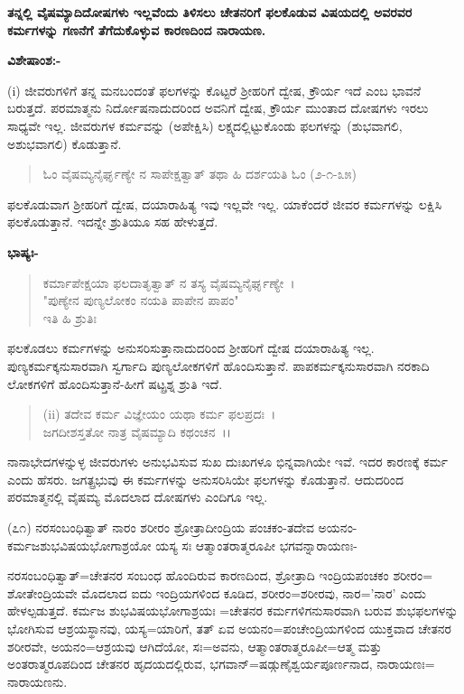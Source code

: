 \begin{center}
\textbf{ತನ್ನಲ್ಲಿ ವೈಷಮ್ಯಾದಿದೋಷಗಳು ಇಲ್ಲವೆಂದು ತಿಳಿಸಲು ಚೇತನರಿಗೆ ಫಲಕೊಡುವ ವಿಷಯದಲ್ಲಿ ಅವರವರ ಕರ್ಮಗಳನ್ನು ಗಣನೆಗೆ ತೆಗೆದುಕೊಳ್ಳುವ ಕಾರಣದಿಂದ ನಾರಾಯಣ.}
\end{center}

\noindent
\textbf{ವಿಶೇಷಾಂಶ:-}

(i) ಜೀವರುಗಳಿಗೆ ತನ್ನ ಮನಬಂದಂತೆ ಫಲಗಳನ್ನು ಕೊಟ್ಟರೆ ಶ‍್ರೀಹರಿಗೆ ದ್ವೇಷ, ಕ್ರೌರ್ಯ ಇದೆ ಎಂಬ ಭಾವನೆ ಬರುತ್ತದೆ. ಪರಮಾತ್ಮನು ನಿರ್ದೋಷನಾದುದರಿಂದ ಅವನಿಗೆ ದ್ವೇಷ, ಕ್ರೌರ್ಯ ಮುಂತಾದ ದೋಷಗಳು ಇರಲು ಸಾಧ್ಯವೇ ಇಲ್ಲ. ಜೀವರುಗಳ ಕರ್ಮವನ್ನು (ಅಪೇಕ್ಷಿಸಿ) ಲಕ್ಷ್ಯದಲ್ಲಿಟ್ಟುಕೊಂಡು ಫಲಗಳನ್ನು (ಶುಭವಾಗಲಿ, ಅಶುಭವಾಗಲಿ) ಕೊಡುತ್ತಾನೆ.

\begin{verse}
ಓಂ ವೈಷಮ್ಯನೈರ್ಘೃಣ್ಯೇ ನ ಸಾಪೇಕ್ಷತ್ವಾತ್ ತಥಾ ಹಿ ದರ್ಶಯತಿ ಓಂ (೨-೧-೩೫)
\end{verse}

ಫಲಕೊಡುವಾಗ ಶ‍್ರೀಹರಿಗೆ ದ್ವೇಷ, ದಯಾರಾಹಿತ್ಯ ಇವು ಇಲ್ಲವೇ ಇಲ್ಲ. ಯಾಕೆಂದರೆ ಜೀವರ ಕರ್ಮಗಳನ್ನು ಲಕ್ಷಿಸಿ ಫಲಕೊಡುತ್ತಾನೆ. ಇದನ್ನೇ ಶ್ರುತಿಯೂ ಸಹ ಹೇಳುತ್ತದೆ.

\noindent
\textbf{ಭಾಷ್ಯಃ-}

\begin{verse}
ಕರ್ಮಾಪೇಕ್ಷಯಾ ಫಲದಾತೃತ್ವಾತ್ ನ ತಸ್ಯ ವೈಷಮ್ಯನೈರ್ಘೃಣ್ಯೇ~।\\ "ಪುಣ್ಯೇನ ಪುಣ್ಯಲೋಕಂ ನಯತಿ ಪಾಪೇನ ಪಾಪಂ"\\ಇತಿ ಹಿ ಶ್ರುತಿಃ
\end{verse}

ಫಲಕೊಡಲು ಕರ್ಮಗಳನ್ನು ಅನುಸರಿಸುತ್ತಾನಾದುದರಿಂದ ಶ‍್ರೀಹರಿಗೆ ದ್ವೇಷ ದಯಾರಾಹಿತ್ಯ ಇಲ್ಲ. ಪುಣ್ಯಕರ್ಮಕ್ಕನುಸಾರವಾಗಿ ಸ್ವರ್ಗಾದಿ ಪುಣ್ಯಲೋಕಗಳಿಗೆ ಹೊಂದಿಸುತ್ತಾನೆ. ಪಾಪಕರ್ಮಕ್ಕನುಸಾರವಾಗಿ ನರಕಾದಿ ಲೋಕಗಳಿಗೆ ಹೊಂದಿಸುತ್ತಾನೆ-ಹೀಗೆ ಷಟ್ಪ್ರಶ್ನ ಶ್ರುತಿ ಇದೆ.

\begin{verse}
(ii) ತದೇವ ಕರ್ಮ ವಿಜ್ಞೇಯಂ ಯಥಾ ಕರ್ಮ ಫಲಪ್ರದಃ~।\\ ಜಗದೀಶಸ್ತತೋ ನಾತ್ರ ವೈಷಮ್ಯಾದಿ ಕಥಂಚನ~।।
\end{verse}


ನಾನಾಭೇದಗಳನ್ನುಳ್ಳ ಜೀವರುಗಳು ಅನುಭವಿಸುವ ಸುಖ ದುಃಖಗಳೂ ಭಿನ್ನವಾಗಿಯೇ ಇವೆ. ಇದರ ಕಾರಣಕ್ಕೆ ಕರ್ಮ ಎಂದು ಹೆಸರು. ಜಗತ್ಪ್ರಭುವು ಈ ಕರ್ಮಗಳನ್ನು ಅನುಸರಿಸಿಯೇ ಫಲಗಳನ್ನು ಕೊಡುತ್ತಾನೆ. ಆದುದರಿಂದ ಪರಮಾತ್ಮನಲ್ಲಿ ವೈಷಮ್ಯ ಮೊದಲಾದ ದೋಷಗಳು ಎಂದಿಗೂ ಇಲ್ಲ.

(೭೧) ನರಸಂಬಂಧಿತ್ವಾತ್ ನಾರಂ ಶರೀರಂ ಶ್ರೋತ್ರಾದೀಂದ್ರಿಯ ಪಂಚಕಂ-ತದೇವ ಅಯನಂ-ಕರ್ಮಜಶುಭವಿಷಯಭೋಗಾಶ್ರಯೋ ಯಸ್ಯ ಸಃ ಆತ್ಮಾಂತರಾತ್ಮರೂಪೀ ಭಗವನ್ನಾರಾಯಣಃ-

ನರಸಂಬಂಧಿತ್ವಾತ್=ಚೇತನರ ಸಂಬಂಧ ಹೊಂದಿರುವ ಕಾರಣದಿಂದ, ಶ್ರೋತ್ರಾದಿ ಇಂದ್ರಿಯಪಂಚಕಂ ಶರೀರಂ= ಶೋತೇಂದ್ರಿಯವೇ ಮೊದಲಾದ ಐದು ಇಂದ್ರಿಯಗಳಿಂದ ಕೂಡಿದ, ಶರೀರಂ=ಶರೀರವು, ನಾರ='ನಾರ' ಎಂದು ಹೇಳಲ್ಪಡುತ್ತದೆ. ಕರ್ಮಜ ಶುಭವಿಷಯಭೋಗಾಶ್ರಯಃ =ಚೇತನರ ಕರ್ಮಗಳಿಗನುಸಾರವಾಗಿ ಬರುವ ಶುಭಫಲಗಳನ್ನು ಭೋಗಿಸುವ ಆಶ್ರಯಸ್ಥಾನವು, ಯಸ್ಯ=ಯಾರಿಗೆ, ತತ್ ಏವ ಅಯನಂ=ಪಂಚೇಂದ್ರಿಯಗಳಿಂದ ಯುಕ್ತವಾದ ಚೇತನರ ಶರೀರವೇ, ಅಯನಂ=ಆಶ್ರಯವು ಆಗಿದೆಯೋ, ಸಃ=ಅವನು, ಆತ್ಮಾಂತರಾತ್ಮರೂಪೀ=ಆತ್ಮ ಮತ್ತು ಅಂತರಾತ್ಮರೂಪದಿಂದ ಚೇತನರ ಹೃದಯದಲ್ಲಿರುವ, ಭಗವಾನ್=ಷಡ್ಗುಣೈಶ್ವರ್ಯಪೂರ್ಣನಾದ, ನಾರಾಯಣಃ= ನಾರಾಯಣನು.

